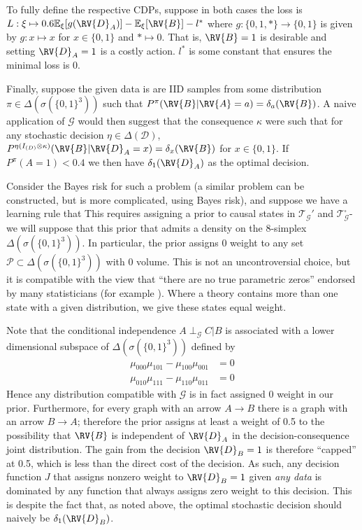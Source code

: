 To fully define the respective CDPs, suppose in both cases the loss is $L:\xi\mapsto 0.6\mathbb{E}_\xi[g(\RV{D}_A)] - \mathbb{E}_{\xi}[\RV{B}] - l^*$ where $g:\{0,1,*\}\to \{0,1\}$ is given by $g:x\mapsto x$ for $x\in \{0,1\}$ and $*\mapsto 0$. That is, $\RV{B}=1$ is desirable and setting $\RV{D}_A=1$ is a costly action. $l^*$ is some constant that ensures the minimal loss is 0.

Finally, suppose the given data is are IID samples from some distribution $\pi\in \Delta(\sigma(\{0,1\}^3))$ such that $P^\pi(\RV{B}|\RV{A}=a)=\delta_a(\RV{B})$. A naive application of $\mathcal{G}$ would then suggest that the consequence $\kappa$ were such that for any stochastic decision $\eta\in \Delta(\mathcal{D})$, $P^{\eta {(I_{(D)}\otimes \kappa)}}(\RV{B}|\RV{D}_A = x) =\delta_x(\RV{B})$ for $x\in\{0,1\}$. If $P^\pi(A=1)<0.4$ we then have $\delta_1(\RV{D}_A)$ as the optimal decision.

Consider the Bayes risk for such a problem (a similar problem can be constructed, but is more complicated, using Bayes risk), and suppose we have a learning rule that  This requires assigning a prior to causal states in $\mathscr{T}_{\mathcal{G}}'$ and $\mathscr{T}_{\mathcal{G}}^\square$- we will suppose that this prior that admits a density on the 8-simplex $\Delta(\sigma(\{0,1\}^3))$. In particular, the prior assigns 0 weight to any set $\mathscr{P}\subset\Delta(\sigma(\{0,1\}^3))$ with 0 volume. This is not an uncontroversial choice, but it is compatible with the view that ``there are no true parametric zeros'' endorsed by many statisticians (for example  \cite{gelman_bayesian_2010,meehl_theory-testing_1967,berkson_difficulties_1938}). Where a theory contains more than one state with a given distribution, we give these states equal weight. 

Note that the conditional independence $A\perp_\mathcal{G} C | B$ is associated with a lower dimensional subspace of $\Delta(\sigma(\{0,1\}^3))$ defined by 
\begin{align}
    \mu_{000}\mu_{101}-\mu_{100}\mu_{001}&=0\label{eq:ci0}\\
    \mu_{010}\mu_{111}-\mu_{110}\mu_{011}&=0 \label{eq:ci}
\end{align}
Hence any distribution compatible with $\mathcal{G}$ is in fact assigned 0 weight in our prior. Furthermore, for every graph with an arrow $A\to B$ there is a graph with an arrow $B\to A$; therefore the prior assigns at least a weight of 0.5 to the possibility that $\RV{B}$ is independent of $\RV{D}_A$ in the decision-consequence joint distribution. The gain from the decision $\RV{D}_B=1$ is therefore ``capped'' at 0.5, which is less than the direct cost of the decision. As such, any decision function $J$ that assigns nonzero weight to $\RV{D}_B = 1$ given \emph{any data} is dominated by any function that always assigns zero weight to this decision. This is despite the fact that, as noted above, the optimal stochastic decision should naively be $\delta_1(\RV{D}_B)$.

